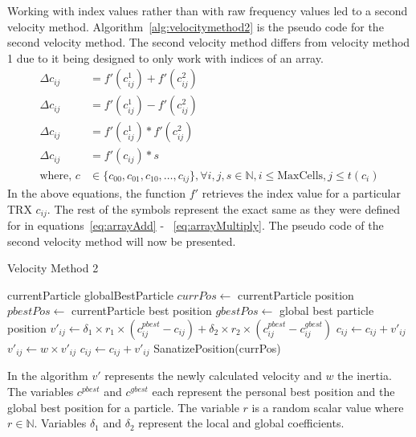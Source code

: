 Working with index values rather than with raw frequency values led to  a second velocity method. Algorithm~\ref{alg:velocitymethod2} is the pseudo code for the second velocity method. The second velocity method differs from velocity method 1 due to it being designed to only work with indices of an array.
\begin{align}
    \Delta c_{ij} &= f'(c^1_{ij}) + f'(c^2_{ij})\label{eq:arrayAdd2}\\
    \Delta c_{ij} &= f'(c^1_{ij}) - f'(c^2_{ij})\label{eq:arraySubtract2}\\
	\Delta c_{ij} &= f'(c^1_{ij}) * f'(c^2_{ij})\label{eq:arrayMultiply2}\\
    \Delta c_{ij} &= f'(c_{ij}) * s \label{eq:arrayScalar2}\\
    \text{where, }c &\in \{c_{00},c_{01},c_{10}, \dots, c_{ij}\} , \forall i,j,s \in \mathbb{N}, i \leq \text{MaxCells}, j \leq t(c_i)\nonumber
\end{align}
In the above equations, the function $f'$ retrieves the index value for a particular TRX $c_{ij}$. The rest of the symbols represent the exact same as they were defined for in equations~\ref{eq:arrayAdd} - ~\ref{eq:arrayMultiply}. The pseudo code of the second velocity method will now be presented.

\begin{algorithm}[H]
\caption{Velocity Method 2}
\label{alg:velocitymethod2}
\begin{algorithmic}[1]
	\Require currentParticle
	\Require globalBestParticle
	\State $currPos \leftarrow$ currentParticle position
	\State $pbestPos \leftarrow$ currentParticle best position
	\State $gbestPos \leftarrow$ global best particle position
		\State $v'_{ij} \leftarrow \delta_1 \times r_1 \times (c^{pbest}_{ij} - c_{ij}) + \delta_2 \times r_2 \times (c^{pbest}_{ij} - c^{gbest}_{ij})$
			\State $c_{ij} \leftarrow c_{ij} + v'_{ij}$
		\Else
			\State $v'_{ij} \leftarrow w \times v'_{ij}$
			\State $c_{ij} \leftarrow c_{ij} + v'_{ij}$
		\EndIf
	\EndFor
	\State SanatizePosition(currPos)
\end{algorithmic}
\end{algorithm}

In the algorithm $v'$ represents the newly calculated velocity and $w$ the inertia. The variables $c^{pbest}$ and $c^{gbest}$ each represent the personal best position and the global best position for a particle. The variable $r$ is a random scalar value where $r \in \mathbb{N}$. Variables $\delta_1$ and $\delta_2$ represent the local and global coefficients.

